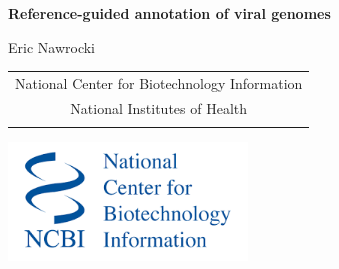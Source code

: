 \documentclass[landscape]{slides}
\begin{document}
\begin{slide}
\begin{center}
\large{\textbf{Reference-guided annotation of viral genomes}}

\normalsize

Eric Nawrocki \\

\medskip

\medskip

\medskip

\medskip

\medskip

\small
\begin{tabular}{c}
National Center for Biotechnology Information\\
National Institutes of Health\\
\\
\end{tabular}

\vspace{0.1in}

\includegraphics[width=2.5in]{figs/ncbi-logo}

\end{center}
\end{slide}
\end{document}
